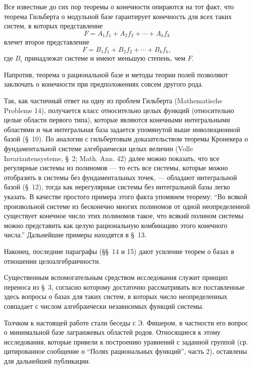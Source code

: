\documentclass[11pt]{article}
\begin{document}
Все известные до сих пор теоремы о конечности опираются на тот факт, что теорема Гильберта о модульной базе гарантирует конечность для всех таких систем, в которых представление
\[
  F=A_1f_1+A_2f_2+\cdots+A_kf_k
\]
влечет второе представление
\[
  F=B_1f_1+B_2f_2+\cdots+B_kf_k,
\]
где $B_i$ принадлежат системе и имеют меньшую степень, чем $F$.

Напротив, теорема о рациональной базе и методы теории полей позволяют заключать о конечности при предположениях совсем другого рода.

Так, как частичный ответ на одну из проблем Гильберта (Mathematische Probleme 14), получается класс относительно целых функций (относительно целые области первого типа), которые являются конечными интегральными областями и чья интегральная база задается упомянутой выше инволюционной базой (\S\ 10). По аналогии с гильбертовым доказательством теоремы Кронекера о фундаментальной системе алгебраически целых величин (Volle Invariantensysteme, \S\ 2; Math. Ann. 42) далее можно показать, что все регулярные системы из полиномов --- то есть все системы, которые можно отобразить в системы без фундаментальных точек, --- обладают интегральной базой (\S\ 12), тогда как нерегулярные системы без интегральной базы легко указать. В качестве простого примера этого факта упомянем теорему: ``Во всякой произвольной системе из бесконечно многих полиномов от одной неопределенной существует конечное число этих полиномов такое, что всякий полином системы можно представить как целую рациональную комбинацию этого конечного числа.'' Дальнейшие примеры находятся в \S\ 13.

Наконец, последние параграфы (\S\S\ 14 и 15) дают усиление теорем о базах в отношении целоалгебраичности.

Существенным вспомогательным средством исследования служит принцип переноса из \S\ 3, согласно которому достаточно рассматривать все поставленные здесь вопросы о базах для таких систем, в которых число неопределенных совпадает с числом алгебраически независимых функций системы.

Толчком к настоящей работе стали беседы с Э. Фишером, в частности его вопрос о минимальной базе лагранжевых областей родов. Относящиеся к этому исследования, которые привели к построению уравнений с заданной группой (ср. цитированное сообщение о ``Полях рациональных функций'', часть 2), оставлены для дальнейшей публикации.
\end{document}
